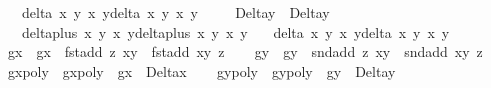 \begin{isabellebody}
\ \ \ {\isacharparenleft}delta\ x{}\ y{}\ x{}\ y{}{\isacharparenright}{\isacharasterisk}{\isacharparenleft}delta\ x{}\ y{}\ x{}\ y{}{\isacharparenright}{\isachardoublequoteclose}\ \isanewline
\ \ \isamarkupfalse%
\ Delta\isactrlsub y\ \ {\isachardoublequoteopen}Delta\isactrlsub y\ {\isacharequal}\isanewline
\ \ \ {\isacharparenleft}delta{\isacharunderscore}plus\ x{}{\isacharprime}\ y{}{\isacharprime}\ x{}\ y{}{\isacharparenright}{\isacharasterisk}{\isacharparenleft}delta{\isacharunderscore}plus\ x{}\ y{}\ x{}{\isacharprime}\ y{}{\isacharprime}{\isacharparenright}{\isacharasterisk}\isanewline
\ \ \ {\isacharparenleft}delta\ x{}\ y{}\ x{}\ y{}{\isacharparenright}{\isacharasterisk}{\isacharparenleft}delta\ x{}\ y{}\ x{}\ y{}{\isacharparenright}{\isachardoublequoteclose}\ \isanewline
\ \ \isamarkupfalse%
\ g\isactrlsub x\ \ {\isachardoublequoteopen}g\isactrlsub x\ {\isacharequal}\ fst{\isacharparenleft}add\ z{}{\isacharprime}\ {\isacharparenleft}x{}{\isacharcomma}y{}{\isacharparenright}{\isacharparenright}\ {\isacharminus}\ fst{\isacharparenleft}add\ {\isacharparenleft}x{}{\isacharcomma}y{}{\isacharparenright}\ z{}{\isacharprime}{\isacharparenright}{\isachardoublequoteclose}\isanewline
\ \ \isamarkupfalse%
\ g\isactrlsub y\ \ {\isachardoublequoteopen}g\isactrlsub y\ {\isacharequal}\ snd{\isacharparenleft}add\ z{}{\isacharprime}\ {\isacharparenleft}x{}{\isacharcomma}y{}{\isacharparenright}{\isacharparenright}\ {\isacharminus}\ snd{\isacharparenleft}add\ {\isacharparenleft}x{}{\isacharcomma}y{}{\isacharparenright}\ z{}{\isacharprime}{\isacharparenright}{\isachardoublequoteclose}\isanewline
\ \ \isamarkupfalse%
\ gxpoly\ \ {\isachardoublequoteopen}gxpoly\ {\isacharequal}\ g\isactrlsub x\ {\isacharasterisk}\ Delta\isactrlsub x{\isachardoublequoteclose}\isanewline
\ \ \isamarkupfalse%
\ gypoly\ \ {\isachardoublequoteopen}gypoly\ {\isacharequal}\ g\isactrlsub y\ {\isacharasterisk}\ Delta\isactrlsub y{\isachardoublequoteclose}\isanewline
\isanewline
\ \ \isamarkupfalse%

\end{isabellebody}
